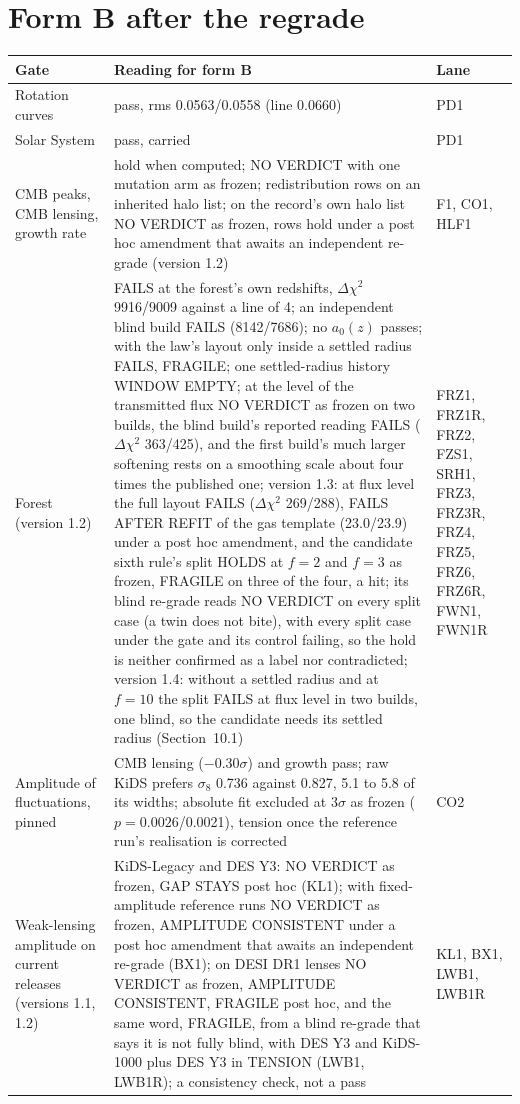 \documentclass[10pt]{article}
\begin{document}
\section{Form B after the regrade}
{\small
\begin{longtable}{@{}p{4.0cm}p{9.4cm}p{2.5cm}@{}}\toprule
Gate & Reading for form B & Lane\\\midrule\endhead
Rotation curves & pass, rms 0.0563/0.0558 (line 0.0660) & PD1\\
Solar System & pass, carried & PD1\\
CMB peaks, CMB lensing, growth rate & hold when computed; NO VERDICT with one mutation arm as frozen; redistribution rows on an inherited halo list; on the record's own halo list NO VERDICT as frozen, rows hold under a post hoc amendment that awaits an independent re-grade (version 1.2) & F1, CO1, HLF1\\
Forest (version 1.2) & FAILS at the forest's own redshifts, $\Delta\chi^2$ 9916/9009 against a line of 4; an independent blind build FAILS (8142/7686); no $a_0(z)$ passes; with the law's layout only inside a settled radius FAILS, FRAGILE; one settled-radius history WINDOW EMPTY; at the level of the transmitted flux NO VERDICT as frozen on two builds, the blind build's reported reading FAILS ($\Delta\chi^2$ 363/425), and the first build's much larger softening rests on a smoothing scale about four times the published one; version 1.3: at flux level the full layout FAILS ($\Delta\chi^2$ 269/288), FAILS AFTER REFIT of the gas template (23.0/23.9) under a post hoc amendment, and the candidate sixth rule's split HOLDS at $f=2$ and $f=3$ as frozen, FRAGILE on three of the four, a hit; its blind re-grade reads NO VERDICT on every split case (a twin does not bite), with every split case under the gate and its control failing, so the hold is neither confirmed as a label nor contradicted; version 1.4: without a settled radius and at $f=10$ the split FAILS at flux level in two builds, one blind, so the candidate needs its settled radius (Section~10.1) & FRZ1, FRZ1R, FRZ2, FZS1, SRH1, FRZ3, FRZ3R, FRZ4, FRZ5, FRZ6, FRZ6R, FWN1, FWN1R\\
Amplitude of fluctuations, pinned & CMB lensing ($-0.30\sigma$) and growth pass; raw KiDS prefers $\sigma_8$ 0.736 against 0.827, 5.1 to 5.8 of its widths; absolute fit excluded at 3$\sigma$ as frozen ($p=0.0026$/0.0021), tension once the reference run's realisation is corrected & CO2\\
Weak-lensing amplitude on current releases (versions 1.1, 1.2) & KiDS-Legacy and DES Y3: NO VERDICT as frozen, GAP STAYS post hoc (KL1); with fixed-amplitude reference runs NO VERDICT as frozen, AMPLITUDE CONSISTENT under a post hoc amendment that awaits an independent re-grade (BX1); on DESI DR1 lenses NO VERDICT as frozen, AMPLITUDE CONSISTENT, FRAGILE post hoc, and the same word, FRAGILE, from a blind re-grade that says it is not fully blind, with DES Y3 and KiDS-1000 plus DES Y3 in TENSION (LWB1, LWB1R); a consistency check, not a pass & KL1, BX1, LWB1, LWB1R\\

\end{longtable}}
\end{document}
